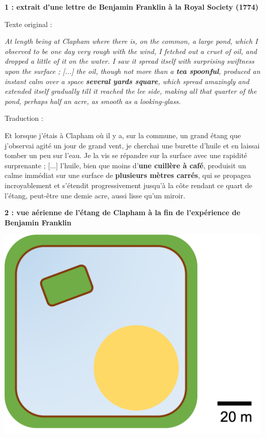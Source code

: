 \documentclass[12pt,a4paper]{article}
\begin{document}
\begin{doc}
\textbf{1 : extrait d'une lettre de Benjamin Franklin à la Royal Society (1774)}
\begin{multicols}{2}
\noindent
Texte original :

\textit{ \og
At length being at Clapham where there is, on the common, a large pond, which I observed to be one day very rough with the wind, I fetched out a cruet of oil, and dropped a little of it on the water.
I saw it spread itself with surprising swiftness upon the surface ;
[...] the oil, though not more than a \textbf{tea spoonful}, produced an instant calm over a space \textbf{several yards square}, which spread amazingly and extended itself gradually till it reached the lee side, making all that quarter of the pond, perhaps half an acre, as smooth as a looking-glass.
\fg{} }

\noindent
Traduction :

Et lorsque j'étais à Clapham où il y a, sur la commune, un grand étang que j'observai agité un jour de grand vent, je cherchai une burette d'huile et en laissai tomber un peu sur l'eau.
Je la vis se répandre sur la surface avec une rapidité surprenante ;
[...] l'huile, bien que moins d'\textbf{une cuillère à café}, produisit un calme immédiat sur une surface de \textbf{plusieurs mètres carrés}, qui se propagea incroyablement et s'étendit progressivement jusqu'à la côte rendant ce quart de l'étang, peut-être une demie acre, aussi lisse qu'un miroir.
\end{multicols}
\end{doc}

\begin{doc}
\textbf{2 : vue aérienne de l'étang de Clapham à la fin de l'expérience de Benjamin Franklin}

\begin{center}
\includegraphics[scale=0.5]{images/clapham_pond.png}
\end{center}
\end{doc}
\end{document}
